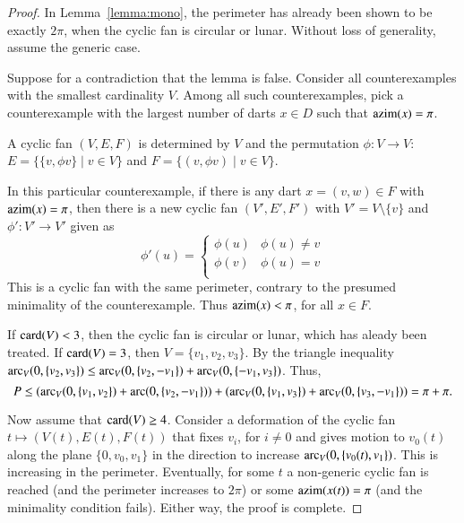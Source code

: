 \begin{proof} In Lemma~\ref{lemma:mono}, the perimeter has already been shown to be exactly $2\pi$, when the cyclic fan is circular or lunar.  Without loss of generality, assume the generic case.

Suppose for a contradiction that the lemma is false.  Consider all counterexamples with the smallest cardinality $V$.  Among all such counterexamples, pick a counterexample with the largest number of darts $x\in D$ such that ${\operatorname{azim}}(x) = \pi$.

A cyclic fan $(V,E,F)$ is determined by $V$ and the permutation $\phi:V\to V$:  $E=\{\{v,\phi v\}\mid v\in V\}$ and $F = \{(v,\phi v)\mid v\in V\}$.

In this particular counterexample, if there is any dart $x=(v,w)\in F$ with ${\operatorname{azim}}(x)=\pi$, then there is a new cyclic fan $(V',E',F')$ with $V' = V\setminus\{v\}$ and $\phi':V'\to V'$ given as 
$$
\phi'(u) = \begin{cases}
\phi(u) & \phi(u)\ne v\\
\phi(v) & \phi(u) = v\\
\end{cases}
$$
This is a cyclic fan with the same perimeter, contrary to the presumed minimality of the counterexample.  Thus ${\operatorname{azim}}(x) <\pi$, for all $x\in F$.

If ${\operatorname{card}}(V) <3$, then the cyclic fan is circular or lunar, which has aleady been treated.  If ${\operatorname{card}}(V)=3$, then $V=\{v_1,v_2,v_3\}$.  By the triangle inequality $\operatorname{arc}_V(0,\{v_2,v_3\}) \le \operatorname{arc}_V(0,\{v_2,-v_1\})+\operatorname{arc}_V(0,\{-v_1,v_3\})$.  Thus,
$$
P \le(\operatorname{arc}_V(0,\{v_1,v_2\})+\operatorname{arc}(0,\{v_2,-v_1\}))+(\operatorname{arc}_V(0,\{v_1,v_3\})+\operatorname{arc}_V(0,\{v_3,-v_1\})) = \pi+\pi.
$$

Now assume that ${\operatorname{card}}(V)\ge 4$.  Consider a deformation of the cyclic fan $t\mapsto (V(t),E(t),F(t))$ that fixes $v_i$, for $i\ne 0$ and gives motion to $v_0(t)$ along the plane $\{0,v_0,v_1\}$ in the direction to increase $\operatorname{arc}_V(0,\{v_0(t),v_1\})$.  This is increasing in the perimeter.  Eventually, for some $t$ a non-generic cyclic fan is reached (and the perimeter increases to $2\pi$) or some ${\operatorname{azim}}(x(t))=\pi$ (and the minimality condition fails).  Either way, the proof is complete. 
\end{proof}

